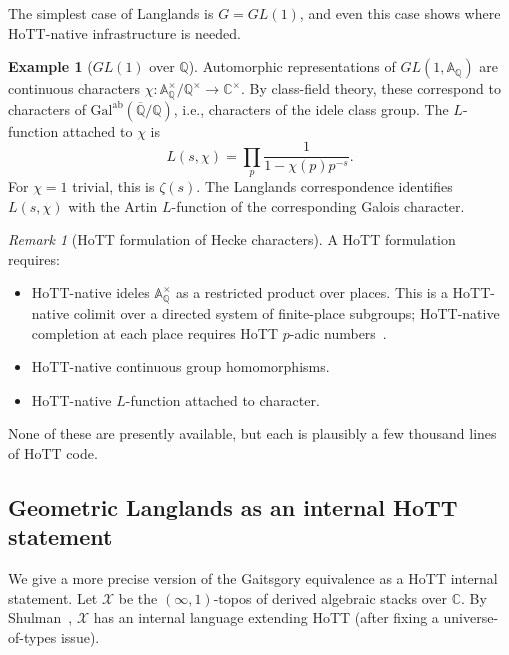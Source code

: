 \documentclass[12pt]{article}
\theoremstyle{definition}
\newtheorem{example}[theorem]{Example}
\theoremstyle{remark}
\newtheorem{remark}[theorem]{Remark}
\newcommand{\C}{\mathbb{C}}
\newcommand{\Q}{\mathbb{Q}}
\begin{document}
The simplest case of Langlands is $G = GL(1)$, and even this case shows
where HoTT-native infrastructure is needed.

\begin{example}[$GL(1)$ over $\Q$]
Automorphic representations of $GL(1, \mathbb{A}_\Q)$ are continuous
characters $\chi: \mathbb{A}_\Q^\times / \Q^\times \to \C^\times$. By
class-field theory, these correspond to characters of $\mathrm{Gal}^{\mathrm{ab}}
(\overline{\Q}/\Q)$, i.e., characters of the idele class group. The
$L$-function attached to $\chi$ is
\[
L(s,\chi) = \prod_p \frac{1}{1 - \chi(p) p^{-s}}.
\]
For $\chi = 1$ trivial, this is $\zeta(s)$. The Langlands correspondence
identifies $L(s,\chi)$ with the Artin $L$-function of the corresponding
Galois character.
\end{example}

\begin{remark}[HoTT formulation of Hecke characters]
A HoTT formulation requires:
\begin{itemize}
\item HoTT-native ideles $\mathbb{A}_\Q^\times$ as a restricted product
over places. This is a HoTT-native colimit over a directed system of
finite-place subgroups; HoTT-native completion at each place requires HoTT
$p$-adic numbers~\cite{HoTTBook}.
\item HoTT-native continuous group homomorphisms.
\item HoTT-native $L$-function attached to character.
\end{itemize}
None of these are presently available, but each is plausibly a few thousand
lines of HoTT code.
\end{remark}

\subsection{Geometric Langlands as an internal HoTT statement}\label{subsec:GLCInternal}

We give a more precise version of the Gaitsgory equivalence as a HoTT
internal statement. Let $\mathcal{X}$ be the $(\infty,1)$-topos of derived
algebraic stacks over $\C$. By Shulman~\cite{Shulman2019InfTopos},
$\mathcal{X}$ has an internal language extending HoTT (after fixing a
universe-of-types issue).
\end{document}

